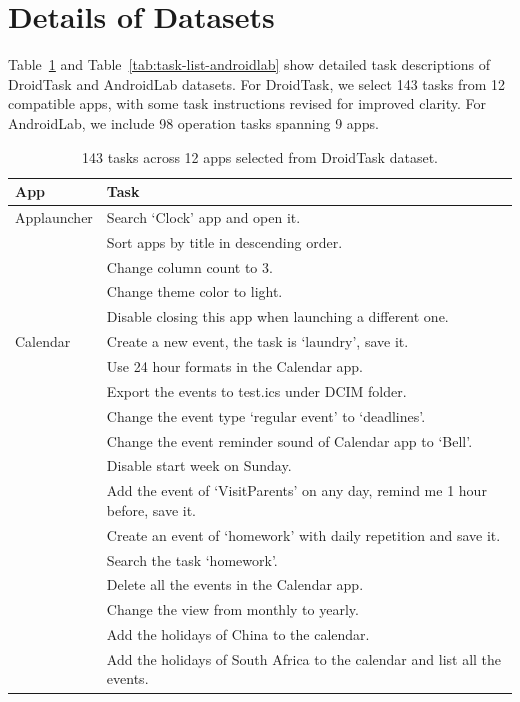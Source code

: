 \section{Details of Datasets}
Table~\ref{tab:task_list} and Table~\ref{tab:task-list-androidlab} show detailed task descriptions of DroidTask \citep{wen2024autodroid} and AndroidLab \citep{xu2024androidlab} datasets. For DroidTask, we select 143 tasks from 12 compatible apps, with some task instructions revised for improved clarity. For AndroidLab, we include 98 operation tasks spanning 9 apps.

\begin{longtable}{|p{1.8cm}|p{10.5cm}|}
\caption{143 tasks across 12 apps selected from DroidTask dataset.}
\label{tab:task_list}\\
\hline
\textbf{App} & \textbf{Task} \\
\hline
Applauncher & Search `Clock' app and open it. \\
           & Sort apps by title in descending order. \\
           & Change column count to 3. \\
           & Change theme color to light. \\
           & Disable closing this app when launching a different one. \\
\hline
Calendar & Create a new event, the task is `laundry', save it. \\
        & Use 24 hour formats in the Calendar app. \\
        & Export the events to test.ics under DCIM folder. \\
        & Change the event type `regular event' to `deadlines'. \\
        & Change the event reminder sound of Calendar app to `Bell'. \\
        & Disable start week on Sunday. \\
        & Add the event of `VisitParents' on any day, remind me 1 hour before, save it. \\
        & Create an event of `homework' with daily repetition and save it. \\
        & Search the task `homework'. \\
        & Delete all the events in the Calendar app. \\
        & Change the view from monthly to yearly. \\
        & Add the holidays of China to the calendar. \\
        & Add the holidays of South Africa to the calendar and list all the events. \\

\end{longtable}
